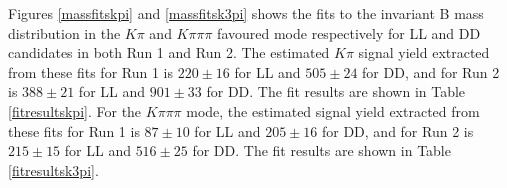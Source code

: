 Figures \ref{massfitskpi} and \ref{massfitsk3pi} shows the fits to the invariant B mass distribution in the $K\pi$ and $K\pi\pi\pi$ favoured mode respectively for LL and DD candidates in both Run 1 and Run 2. The estimated $K\pi$ signal yield extracted from these fits for Run 1 is $220 \pm 16$ for LL and $505 \pm 24$ for DD, and for Run 2 is $388 \pm 21$ for LL and $901 \pm 33$ for DD. The fit results are shown in Table \ref{fitresultskpi}. For the $K\pi\pi\pi$ mode, the estimated signal yield extracted from these fits for Run 1 is $87 \pm 10$ for LL and $205 \pm 16$ for DD, and for Run 2 is $215 \pm 15$ for LL and $516 \pm 25$ for DD. The fit results are shown in Table \ref{fitresultsk3pi}.

\begin{figure}
\centering
{}
\vspace{-12pt}
\hfill
{}
\vspace{-12pt}
\hfill
{}

\end{figure}

